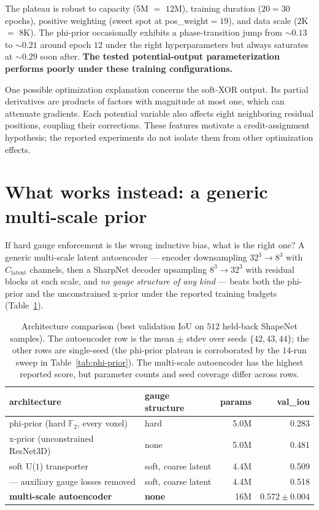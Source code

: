 \documentclass[11pt,a4paper]{article}
\begin{document}
The plateau is robust to capacity ($5$M $=$ $12$M), training duration
($20=30$ epochs), positive weighting (sweet spot at pos\_weight$=19$),
and data scale ($2$K $=$ $8$K). The phi-prior occasionally exhibits a
phase-transition jump from $\sim 0.13$ to $\sim 0.21$ around epoch $12$
under the right hyperparameters but always saturates at $\sim 0.29$
soon after. \textbf{The tested potential-output parameterization performs
poorly under these training configurations.}

One possible optimization explanation concerns the soft-XOR output.
Its partial derivatives are products of factors with magnitude at most one,
which can attenuate gradients. Each potential variable also affects eight
neighboring residual positions, coupling their corrections. These features
motivate a credit-assignment hypothesis; the reported experiments do not
isolate them from other optimization effects.

\section{What works instead: a generic multi-scale prior}
\label{sec:autoencoder}

If hard gauge enforcement is the wrong inductive bias, what is the
right one? A generic multi-scale latent autoencoder --- encoder
downsampling $32^3 \to 8^3$ with $C_{\mathrm{latent}}$ channels, then a
SharpNet decoder upsampling $8^3 \to 32^3$ with residual blocks at each
scale, and \emph{no gauge structure of any kind} --- beats both the
phi-prior and the unconstrained x-prior under the reported training budgets
(Table~\ref{tab:compare}).

\begin{table}[h]
\centering
\small
\begin{tabular}{llrr}
\toprule
architecture & gauge structure & params & val\_iou \\
\midrule
phi-prior (hard $\mathbb{F}_2$, every voxel) & hard                  & 5.0M  & 0.283 \\
x-prior (unconstrained ResNet3D)             & none                  & 5.0M  & 0.481 \\
soft U($1$) transporter                      & soft, coarse latent   & 4.4M  & 0.509 \\
\quad --- auxiliary gauge losses removed     & soft, coarse latent   & 4.4M  & 0.518 \\
\textbf{multi-scale autoencoder}             & \textbf{none}         & 16M   & \textbf{$0.572 \pm 0.004$} \\
\bottomrule
\end{tabular}
\caption{Architecture comparison (best validation IoU on $512$
held-back ShapeNet samples). The autoencoder row is the mean $\pm$
stdev over seeds $\{42,43,44\}$; the other rows are single-seed (the
phi-prior plateau is corroborated by the $14$-run sweep in
Table~\ref{tab:phi-prior}). The multi-scale autoencoder has the highest
reported score, but parameter counts and seed coverage differ across rows.}
\label{tab:compare}
\end{table}
\end{document}
